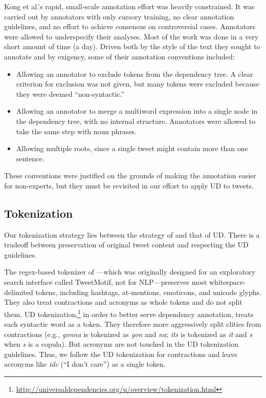 \documentclass[11pt,a4paper]{article}
\begin{document}
Kong et al.'s rapid, small-scale annotation effort was heavily constrained.  It was
carried out by annotators with only cursory training, no clear
annotation guidelines, and no effort to achieve consensus on controversial
cases. Annotators were allowed to underspecify their analyses.
Most of the work was done in a very short amount of
time (a day).  Driven both by the style of the text they sought to annotate
and by exigency, some of their annotation conventions included:
\begin{itemize}
\item Allowing an annotator to exclude tokens from the dependency
  tree.  A clear criterion for exclusion was not given, but many
  tokens were excluded because they were deemed ``non-syntactic.''\item Allowing an annotator to merge a multiword expression into a
  single node in the dependency tree, with no internal structure.
  Annotators were allowed to take the same step with noun phrases.
\item Allowing multiple roots, since a single tweet might contain more
  than one sentence.
\end{itemize}
These conventions were justified on the grounds of making the
annotation easier for non-experts, but they must be revisited in our
effort to apply UD to tweets.

\subsection{Tokenization}\label{sec:tok-anno}
Our tokenization strategy lies between the strategy of
\citet{ICWSM101540} and that of UD.
There is a tradeoff between preservation of original tweet content and respecting
the UD guidelines.

The regex-based tokenizer of \citet{ICWSM101540}---which was 
originally designed for an exploratory search interface called
TweetMotif, not for NLP---preserves most whitespace-delimited tokens, including 
hashtags, at-mentions, emoticons, and unicode glyphs. 
They also treat contractions and acronyms as whole tokens and do not split them.
UD
tokenization,\footnote{\url{http://universaldependencies.org/u/overview/tokenization.html}}
in order to better serve dependency annotation, treats each syntactic word as a token.
They therefore more aggressively split
clitics from contractions (e.g., {\it  gonna} is tokenized as {\it gon} and {\it na}; {\it its}
is tokenized as {\it it} and {\it s} when {\it s} is a copula).
But acronyms are not touched
in the UD tokenization guidelines. Thus, we follow the UD tokenization for contractions
and leave acronyms like {\em idc} (``I don't care'') as a single token. 
\end{document}
